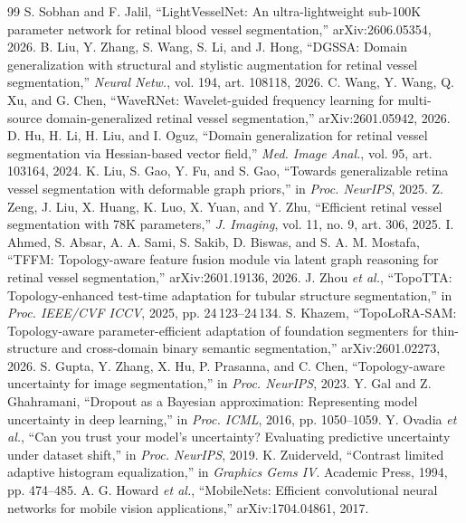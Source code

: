 \documentclass[conference]{IEEEtran}
\begin{document}
\begin{thebibliography}{99}
 S. Sobhan and F. Jalil, ``LightVesselNet: An ultra-lightweight sub-100K parameter network for retinal blood vessel segmentation,'' arXiv:2606.05354, 2026.
 B. Liu, Y. Zhang, S. Wang, S. Li, and J. Hong, ``DGSSA: Domain generalization with structural and stylistic augmentation for retinal vessel segmentation,'' \emph{Neural Netw.}, vol. 194, art. 108118, 2026.
 C. Wang, Y. Wang, Q. Xu, and G. Chen, ``WaveRNet: Wavelet-guided frequency learning for multi-source domain-generalized retinal vessel segmentation,'' arXiv:2601.05942, 2026.
 D. Hu, H. Li, H. Liu, and I. Oguz, ``Domain generalization for retinal vessel segmentation via Hessian-based vector field,'' \emph{Med. Image Anal.}, vol. 95, art. 103164, 2024.
 K. Liu, S. Gao, Y. Fu, and S. Gao, ``Towards generalizable retina vessel segmentation with deformable graph priors,'' in \emph{Proc. NeurIPS}, 2025.
 Z. Zeng, J. Liu, X. Huang, K. Luo, X. Yuan, and Y. Zhu, ``Efficient retinal vessel segmentation with 78K parameters,'' \emph{J. Imaging}, vol. 11, no. 9, art. 306, 2025.
 I. Ahmed, S. Absar, A. A. Sami, S. Sakib, D. Biswas, and S. A. M. Mostafa, ``TFFM: Topology-aware feature fusion module via latent graph reasoning for retinal vessel segmentation,'' arXiv:2601.19136, 2026.
 J. Zhou \emph{et al.}, ``TopoTTA: Topology-enhanced test-time adaptation for tubular structure segmentation,'' in \emph{Proc. IEEE/CVF ICCV}, 2025, pp. 24\,123--24\,134.
 S. Khazem, ``TopoLoRA-SAM: Topology-aware parameter-efficient adaptation of foundation segmenters for thin-structure and cross-domain binary semantic segmentation,'' arXiv:2601.02273, 2026.
 S. Gupta, Y. Zhang, X. Hu, P. Prasanna, and C. Chen, ``Topology-aware uncertainty for image segmentation,'' in \emph{Proc. NeurIPS}, 2023.
 Y. Gal and Z. Ghahramani, ``Dropout as a Bayesian approximation: Representing model uncertainty in deep learning,'' in \emph{Proc. ICML}, 2016, pp. 1050--1059.
 Y. Ovadia \emph{et al.}, ``Can you trust your model's uncertainty? Evaluating predictive uncertainty under dataset shift,'' in \emph{Proc. NeurIPS}, 2019.
 K. Zuiderveld, ``Contrast limited adaptive histogram equalization,'' in \emph{Graphics Gems IV}. Academic Press, 1994, pp. 474--485.
 A. G. Howard \emph{et al.}, ``MobileNets: Efficient convolutional neural networks for mobile vision applications,'' arXiv:1704.04861, 2017.

\end{thebibliography}
\end{document}
